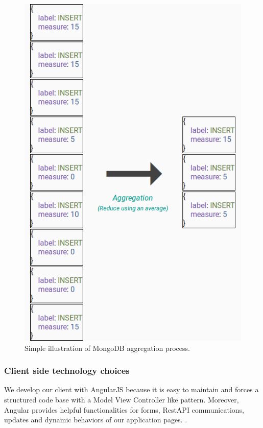 \documentclass[a4paper,11pt]{report}
\begin{document}
\begin{figure}[ht]
\begin{center}
\includegraphics[scale=0.6]{images/mongodb-agg.png}
\caption{Simple illustration of MongoDB aggregation process.}
\label{mongo_agg}
\end{center}
\end{figure}

\clearpage

\subsubsection{Client side technology choices}

We develop our client with AngularJS because it is easy to maintain and forces a structured code base with a Model View Controller like pattern. Moreover, Angular provides helpful functionalities for forms, RestAPI communications, updates and dynamic behaviors of our application pages. \cite{angular:website}.
\end{document}
